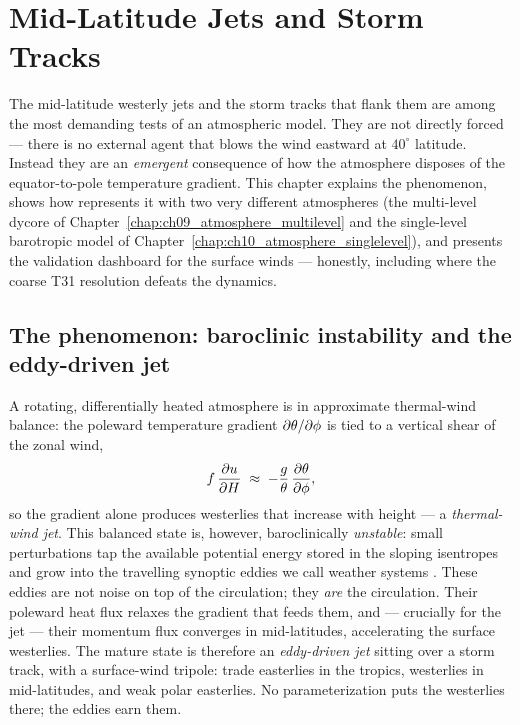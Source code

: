 \chapter{Mid-Latitude Jets and Storm Tracks}
\label{chap:ch18_jets_stormtracks}

The mid-latitude westerly jets and the storm tracks that flank them are among the most
demanding tests of an atmospheric model. They are not directly forced --- there is no external
agent that blows the wind eastward at $40^\circ$ latitude. Instead they are an \emph{emergent}
consequence of how the atmosphere disposes of the equator-to-pole temperature gradient. This
chapter explains the phenomenon, shows how \model{} represents it with two very different
atmospheres (the multi-level \dino{} dycore of
Chapter~\ref{chap:ch09_atmosphere_multilevel} and the single-level barotropic model of
Chapter~\ref{chap:ch10_atmosphere_singlelevel}), and presents the validation dashboard for the
surface winds --- honestly, including where the coarse T31 resolution defeats the dynamics.

\section{The phenomenon: baroclinic instability and the eddy-driven jet}

A rotating, differentially heated atmosphere is in approximate thermal-wind balance: the
poleward temperature gradient $\partial\theta/\partial\phi$ is tied to a vertical shear of the
zonal wind,
\begin{equation}
  f\,\frac{\partial u}{\partial H} \;\approx\; -\frac{g}{\theta}\,\frac{\partial \theta}{\partial \phi},
  \label{eq:thermalwind}
\end{equation}
so the gradient alone produces westerlies that increase with height --- a \emph{thermal-wind
jet}. This balanced state is, however, baroclinically \emph{unstable}: small perturbations tap
the available potential energy stored in the sloping isentropes and grow into the travelling
synoptic eddies we call weather systems \citep{vallis2017}. These eddies are not noise on top
of the circulation; they \emph{are} the circulation. Their poleward heat flux relaxes the
gradient that feeds them, and --- crucially for the jet --- their momentum flux converges in
mid-latitudes, accelerating the surface westerlies. The mature state is therefore an
\emph{eddy-driven jet} sitting over a storm track, with a surface-wind tripole: trade
easterlies in the tropics, westerlies in mid-latitudes, and weak polar easterlies. No
parameterization puts the westerlies there; the eddies earn them.

